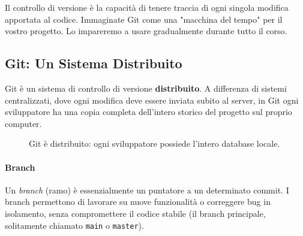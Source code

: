 \documentclass[11pt,a4paper]{report}
\begin{document}
Il controllo di versione è la capacità di tenere traccia di ogni singola modifica apportata al codice. Immaginate Git come una "macchina del tempo" per il vostro progetto. Lo impareremo a usare gradualmente durante tutto il corso.

\subsection{Git: Un Sistema Distribuito}
Git è un sistema di controllo di versione \textbf{distribuito}. A differenza di sistemi centralizzati, dove ogni modifica deve essere inviata subito al server, in Git ogni sviluppatore ha una copia completa dell'intero storico del progetto sul proprio computer.

\begin{figure}[ht]
\centering
{}
\caption{Git è distribuito: ogni sviluppatore possiede l'intero database locale.}
\end{figure}

\paragraph{Branch}
Un \textit{branch} (ramo) è essenzialmente un puntatore a un determinato commit. I branch permettono di lavorare su nuove funzionalità o correggere bug in isolamento, senza compromettere il codice stabile (il branch principale, solitamente chiamato \texttt{main} o \texttt{master}).
\end{document}
